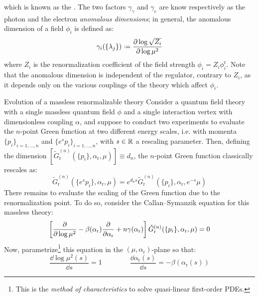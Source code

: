 which is known as the . The two factors $ \gamma_\gamma $ and $ \gamma_e $ are know respectively as the photon and the electron \emph{anomalous dimensions}; in general, the anomalous dimension of a field $ \phi_i $ is defined as:
\begin{equation}
  \gamma_i(\{\lambda_j\}) \defeq \frac{\pa \log \sqrt{Z_i}}{\pa \log \mu^2}
\end{equation}
where $ Z_i $ is the renormalization coefficient of the field strength $ \phi_i = Z_i \phi^\text{r}_i $. Note that the anomalous dimension is independent of the regulator, contrary to $ Z_i $, as it depends only on the various couplings of the theory which affect $ \phi_i $.

\begin{example}{Evolution of a massless renormalizable theory}{}
  Consider a quantum field theory with a single massless quantum field $ \phi $ and a single interaction vertex with dimensionless coupling $ \alpha $, and suppose to conduct two experiments to evaluate the $ n $-point Green function at two different energy scales, i.e. with momenta $ \{p_i\}_{i = 1 , \dots , n} $ and $ \{e^s p_i\}_{i = 1 , \dots , n} $, with $ s \in \mathbb{R} $ a rescaling parameter. Then, defining the dimension $ [\tilde{G}_\text{r}^{(n)}(\{p_i\} , \alpha_\text{r} , \mu)] \equiv d_n $, the $ n $-point Green function classically rescales as:
  \begin{equation*}
    \tilde{G}_\text{r}^{(n)}(\{e^s p_i\} , \alpha_\text{r} , \mu) = e^{d_n s} \tilde{G}_\text{r}^{(n)}(\{p_i\} , \alpha_\text{r} , e^{-s} \mu)
  \end{equation*}
  There remains to evaluate the scaling of the Green function due to the renormalization point. To do so, consider the Callan--Symanzik equation for this massless theory:
  \begin{equation*}
    \left[ \frac{\partial}{\partial \log \mu^2} - \beta(\alpha_\text{r}) \frac{\partial}{\partial \alpha_\text{r}} + n \gamma(\alpha_\text{r}) \right] \tilde{G}_\text{r}^{(n)}(\{p_i\} , \alpha_\text{r} , \mu) = 0
  \end{equation*}
  Now, parametrize\footnote{This is the \emph{method of characteristics} to solve quasi-linear first-order PDEs.} this equation in the $ (\mu , \alpha_\text{r}) $-plane so that:
  \begin{equation*}
    \frac{\dd \log \mu^2(s)}{\dd s} = 1
    \qquad \qquad
    \frac{\dd \alpha_\text{r}(s)}{\dd s} = - \beta(\alpha_\text{r}(s))
  \end{equation*}

\end{example}
